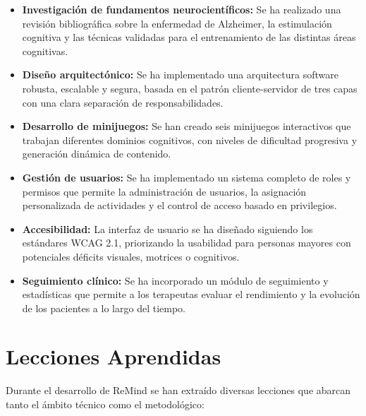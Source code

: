 \begin{itemize}
    \item \textbf{Investigación de fundamentos neurocientíficos:} Se ha realizado una revisión bibliográfica sobre la enfermedad de Alzheimer, la estimulación cognitiva y las técnicas validadas para el entrenamiento de las distintas áreas cognitivas.
    \item \textbf{Diseño arquitectónico:} Se ha implementado una arquitectura software robusta, escalable y segura, basada en el patrón cliente-servidor de tres capas con una clara separación de responsabilidades.
    \item \textbf{Desarrollo de minijuegos:} Se han creado seis minijuegos interactivos que trabajan diferentes dominios cognitivos, con niveles de dificultad progresiva y generación dinámica de contenido.
    \item \textbf{Gestión de usuarios:} Se ha implementado un sistema completo de roles y permisos que permite la administración de usuarios, la asignación personalizada de actividades y el control de acceso basado en privilegios.
    \item \textbf{Accesibilidad:} La interfaz de usuario se ha diseñado siguiendo los estándares WCAG 2.1, priorizando la usabilidad para personas mayores con potenciales déficits visuales, motrices o cognitivos.
    \item \textbf{Seguimiento clínico:} Se ha incorporado un módulo de seguimiento y estadísticas que permite a los terapeutas evaluar el rendimiento y la evolución de los pacientes a lo largo del tiempo.
\end{itemize}

\section{Lecciones Aprendidas}

Durante el desarrollo de ReMind se han extraído diversas lecciones que abarcan tanto el ámbito técnico como el metodológico:

